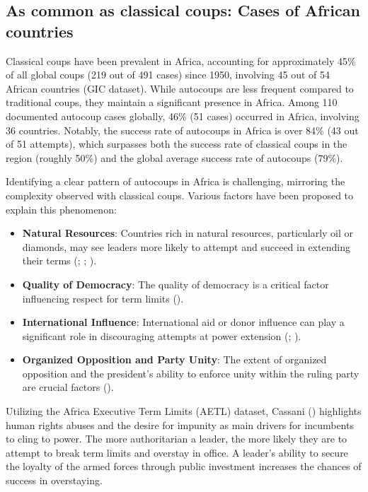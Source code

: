 \documentclass[
  12pt,
]{report}
\begin{document}
\subsection{As common as classical coups: Cases of African
countries}\label{as-common-as-classical-coups-cases-of-african-countries}

Classical coups have been prevalent in Africa, accounting for
approximately 45\% of all global coups (219 out of 491 cases) since
1950, involving 45 out of 54 African countries (GIC dataset). While
autocoups are less frequent compared to traditional coups, they maintain
a significant presence in Africa. Among 110 documented autocoup cases
globally, 46\% (51 cases) occurred in Africa, involving 36 countries.
Notably, the success rate of autocoups in Africa is over 84\% (43 out of
51 attempts), which surpasses both the success rate of classical coups
in the region (roughly 50\%) and the global average success rate of
autocoups (79\%).

Identifying a clear pattern of autocoups in Africa is challenging,
mirroring the complexity observed with classical coups. Various factors
have been proposed to explain this phenomenon:

\begin{itemize}
\item
  \textbf{Natural Resources}: Countries rich in natural resources,
  particularly oil or diamonds, may see leaders more likely to attempt
  and succeed in extending their terms (; ;
  ).
\item
  \textbf{Quality of Democracy}: The quality of democracy is a critical
  factor influencing respect for term limits
  ().
\item
  \textbf{International Influence}: International aid or donor influence
  can play a significant role in discouraging attempts at power
  extension (;
  ).
\item
  \textbf{Organized Opposition and Party Unity}: The extent of organized
  opposition and the president's ability to enforce unity within the
  ruling party are crucial factors
  ().
\end{itemize}

Utilizing the Africa Executive Term Limits (AETL) dataset, Cassani
() highlights human rights abuses and
the desire for impunity as main drivers for incumbents to cling to
power. The more authoritarian a leader, the more likely they are to
attempt to break term limits and overstay in office. A leader's ability
to secure the loyalty of the armed forces through public investment
increases the chances of success in overstaying.
\end{document}
